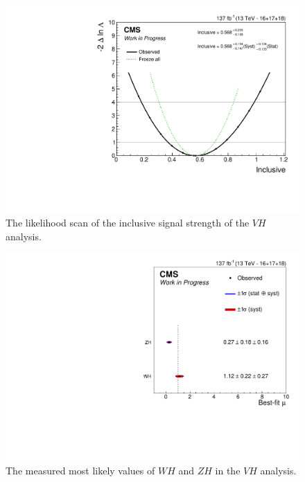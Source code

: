 \begin{figure}
  \centering
  \includegraphics[width=0.8\linewidth]{figures/210309_incl_unblinded_Xbb_8f854f5a_a866aef8/scan_nominal_r.pdf}
  \caption[Inclusive likelihood scan of $V\!H$]{
    The likelihood scan of the inclusive signal strength of the
    $V\!H$ analysis.
  }
  \label{fig:vh-inclusive}
\end{figure}

\begin{figure}
  \centering
  \includegraphics[width=0.8\linewidth]{figures/210309_vh_unblinded_Xbb_8f854f5a_a866aef8/summary_stxs.pdf}
  \caption[Measured values of $W\!H$ and $Z\!H$]{
    The measured most likely values of $W\!H$ and $Z\!H$ in the
    $V\!H$ analysis.
  }
  \label{fig:vh-whzh}
\end{figure}


